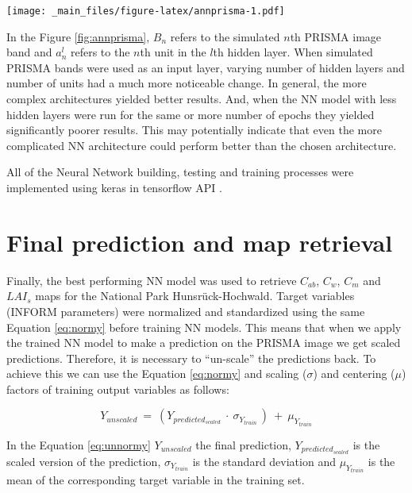 \documentclass[a4paper, twoside]{templates/ociamthesis}
\let\origfigure\figure
\let\endorigfigure\endfigure
\renewenvironment{figure}[1][2] {
    \expandafter\origfigure\expandafter[H]
} {
    \endorigfigure
}
\begin{document}
\begin{figure}
\centering
\texttt{[image: \_main\_files/figure-latex/annprisma-1.pdf]}
\caption{\label{fig:annprisma}Architecture of the Neural Network with simulated PRISMA image bands as inputs}
\end{figure}

In the Figure \ref{fig:annprisma}, \(B_{n}\) refers to the simulated \(n\)th PRISMA image band and \(a_{n}^{l}\) refers to the \(n\)th unit in the \(l\)th hidden layer. When simulated PRISMA bands were used as an input layer, varying number of hidden layers and number of units had a much more noticeable change. In general, the more complex architectures yielded better results. And, when the NN model with less hidden layers were run for the same or more number of epochs they yielded significantly poorer results. This may potentially indicate that even the more complicated NN architecture could perform better than the chosen architecture.

All of the Neural Network building, testing and training processes were implemented using keras \citep{keras} in tensorflow API \citep{tensorflow}.

\hypertarget{final-prediction-and-map-retrieval}{%
\section{Final prediction and map retrieval}\label{final-prediction-and-map-retrieval}}

Finally, the best performing NN model was used to retrieve \(C_{ab}\), \(C_{w}\), \(C_{m}\) and \(LAI_{s}\) maps for the National Park Hunsrück-Hochwald. Target variables (INFORM parameters) were normalized and standardized using the same Equation \eqref{eq:normy} before training NN models. This means that when we apply the trained NN model to make a prediction on the PRISMA image we get scaled predictions. Therefore, it is necessary to ``un-scale'' the predictions back. To achieve this we can use the Equation \eqref{eq:normy} and scaling (\(\sigma\)) and centering (\(\mu\)) factors of training output variables as follows:

\begin{equation}
Y_{unscaled}\ =\ \left(Y_{predicted_{scaled}}\ \cdot\ \sigma_{Y_{train}\ }\right)\ +\ \mu_{Y_{train}}
\label{eq:unnormy}
\end{equation}

In the Equation \eqref{eq:unnormy} \(Y_{unscaled}\) the final prediction, \(Y_{predicted_{scaled}}\) is the scaled version of the prediction, \(\sigma_{Y_{train}}\) is the standard deviation and \(\mu_{Y_{train}}\) is the mean of the corresponding target variable in the training set.
\end{document}
